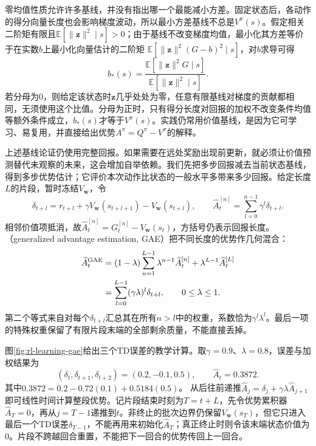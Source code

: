 零均值性质允许许多基线，并没有指出哪一个最能减小方差。固定状态后，各动作的得分向量长度也会影响梯度波动，所以最小方差基线不总是$V^\pi(s)$。假定相关二阶矩有限且$\mathbb E[\lVert\bm z\rVert^2\mid s]>0$；由于基线不改变梯度均值，最小化其方差等价于在实数$b$上最小化向量估计的二阶矩
$\mathbb E[\lVert\bm z\rVert^2(G-b)^2\mid s]$，对$b$求导可得
\[
  b_*(s)=
    \frac{\mathbb E[\lVert\bm z\rVert^2G\mid s]}
         {\mathbb E[\lVert\bm z\rVert^2\mid s]}.
\]
若分母为0，则给定该状态时$\bm z$几乎处处为零，任意有限基线对梯度的贡献都相同，无须使用这个比值。分母为正时，只有得分长度对回报的加权不改变条件均值等额外条件成立，$b_*(s)$才等于$V^\pi(s)$。实践仍常用价值基线，是因为它可学习、易复用，并直接给出优势$A^\pi=Q^\pi-V^\pi$的解释。

上述基线论证仍使用完整回报。如果需要在远处奖励出现前更新，就必须让价值预测替代未观察的未来，这会增加自举依赖。我们先把多步回报减去当前状态基线，得到多步优势估计；它评价本次动作比状态的一般水平多带来多少回报。给定长度$L$的片段，暂时冻结$V_{\bm w}$，令
\[
  \delta_{t+l}=r_{t+l}+\gamma V_{\bm w}(s_{t+l+1})
                            -V_{\bm w}(s_{t+l}),\qquad
  \widehat A_t^{[n]}=\sum_{l=0}^{n-1}\gamma^l\delta_{t+l}.
\]
相邻价值项抵消，故$\widehat A_t^{[n]}=G_t^{[n]}-V_{\bm w}(s_t)$，方括号仍表示回报长度。（generalized advantage estimation, GAE）把不同长度的优势作几何混合：
\begin{align}
  \widehat A_t^{\mathrm{GAE}}
    &=(1-\lambda)\sum_{n=1}^{L-1}\lambda^{n-1}\widehat A_t^{[n]}
       +\lambda^{L-1}\widehat A_t^{[L]}
       \notag\\
    &=\sum_{l=0}^{L-1}(\gamma\lambda)^l\delta_{t+l},
       \qquad 0\leq\lambda\leq1.
    \label{eq:rl-learning-gae}
\end{align}
第二个等式来自对每个$\delta_{t+l}$汇总其在所有$n>l$中的权重，系数恰为$\gamma^l\lambda^l$。最后一项的特殊权重保留了有限片段末端的全部剩余质量，不能直接丢掉。

图\ref{fig:rl-learning-gae}给出三个TD误差的教学计算。取$\gamma=0.9$、$\lambda=0.8$，误差与加权结果为
\[
  (\delta_t,\delta_{t+1},\delta_{t+2})=(0.2,-0.1,0.5),\qquad
  \widehat A_t=0.3872.
\]
其中$0.3872=0.2-0.72(0.1)+0.5184(0.5)$。
从后往前递推$\widehat A_j=\delta_j+\gamma\lambda\widehat A_{j+1}$即可线性时间计算整段优势。记片段结束时刻为$T=t+L$，先令优势累积器$\widehat A_T=0$，再从$j=T-1$递推到$t$。非终止的批次边界仍保留$V_{\bm w}(s_T)$，但它只进入最后一个TD误差$\delta_{T-1}$，不能再用来初始化$\widehat A_T$；真正终止时则令该末端状态价值为0。片段不跨越回合重置，不能把下一回合的优势传回上一回合。

